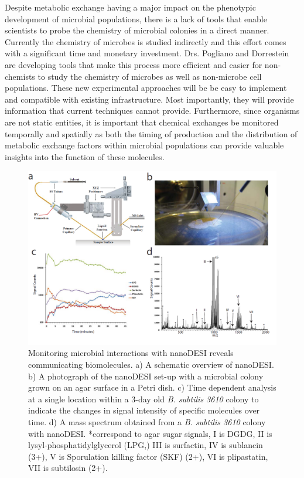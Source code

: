 \documentclass[arial,11pt]{article}
\begin{document}
Despite metabolic exchange having a major impact on the phenotypic development of microbial populations, there is a lack of tools that enable scientists to probe the chemistry of microbial colonies in a direct manner.
Currently the chemistry of microbes is studied indirectly
and this effort comes with a significant time and monetary investment.
Drs. Pogliano and Dorrestein are developing tools that make this process more efficient and easier for non-chemists to study the chemistry of microbes as well as non-microbe cell populations.
These new experimental approaches will be  be easy to implement and  compatible with existing infrastructure.
Most importantly, they will provide information that current techniques cannot provide.
Furthermore, since organisms are not static entities, it is important that chemical exchanges be monitored temporally and spatially as both the timing of production and the distribution of metabolic exchange factors within microbial populations can provide valuable insights into the function of these molecules.

\begin{figure}[ht!]
    \includegraphics[width=\textwidth]{figures/figNanoDESI.png}
  \caption{\footnotesize   Monitoring microbial interactions with nanoDESI reveals communicating biomolecules. a) A schematic overview of nanoDESI. b) A photograph of the nanoDESI set-up with a microbial colony grown on an agar surface in a Petri dish. c) Time dependent analysis at a single location within a 3-day old {\em B. subtilis 3610} colony to indicate the changes in signal intensity of specific molecules over time. d) A mass spectrum obtained from a {\em B. subtilis 3610} colony with nanoDESI. *correspond to agar sugar signals, I is DGDG, II is lysyl-phosphatidylglycerol (LPG,) III is surfactin, IV is sublancin (3+), V is Sporulation killing factor (SKF) (2+), VI is plipastatin, VII is subtilosin (2+).}
  \label{fig.dbp.dorrestein.desi}
\end{figure}
\end{document}
